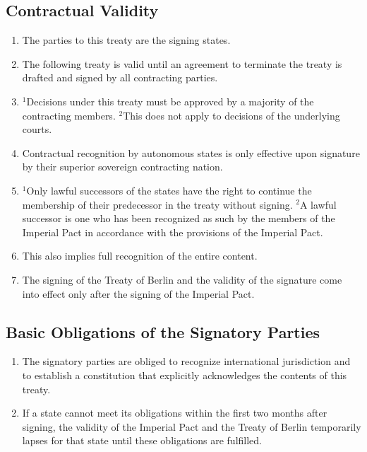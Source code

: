 \documentclass{article}
\begin{document}
\subsection{Contractual Validity}
\begin{enumerate}[(1)]
    \item The parties to this treaty are the signing states.
    \item The following treaty is valid until an agreement to terminate the treaty is drafted and signed by all contracting parties.
    \item ${^1}$Decisions under this treaty must be approved by a majority of the contracting members. ${^2}$This does not apply to decisions of the underlying courts.
    \item Contractual recognition by autonomous states is only effective upon signature by their superior sovereign contracting nation.
    \item ${^1}$Only lawful successors of the states have the right to continue the membership of their predecessor in the treaty without signing. ${^2}$A lawful successor is one who has been recognized as such by the members of the Imperial Pact in accordance with the provisions of the Imperial Pact.
    \item This also implies full recognition of the entire content.
    \item The signing of the Treaty of Berlin and the validity of the signature come into effect only after the signing of the Imperial Pact.
\end{enumerate}

\subsection{Basic Obligations of the Signatory Parties}
\begin{enumerate}[(1)]
    \item The signatory parties are obliged to recognize international jurisdiction and to establish a constitution that explicitly acknowledges the contents of this treaty.
    \item If a state cannot meet its obligations within the first two months after signing, the validity of the Imperial Pact and the Treaty of Berlin temporarily lapses for that state until these obligations are fulfilled.
\end{enumerate}
\end{document}
